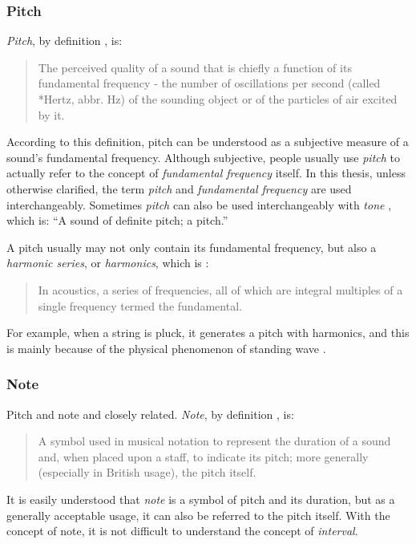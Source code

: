 \subsubsection{Pitch}
{\it Pitch}, by definition \cite{randel1999harvard}, is:
\begin{quote}
The perceived quality of a sound that is chiefly a function of its fundamental frequency - the number of oscillations per second (called *Hertz, abbr. Hz) of the sounding object or of the particles of air excited by it.
\end{quote}
According to this definition, pitch can be understood as a subjective measure of a sound's fundamental frequency. Although subjective, people usually use {\it pitch} to actually refer to the concept of {\it fundamental frequency} itself. In this thesis, unless otherwise clarified, the term {\it pitch} and {\it fundamental frequency} are used interchangeably. Sometimes {\it pitch} can also be used interchangeably with {\it tone} \cite{randel1999harvard}, which is: ``A sound of definite pitch; a pitch.''

A pitch usually may not only contain its fundamental frequency, but also a {\it harmonic series}, or {\it harmonics}, which is \cite{randel1999harvard}:
\begin{quote}
In acoustics, a series of frequencies, all of which are integral multiples of a single frequency termed the fundamental.
\end{quote}
For example, when a string is pluck, it generates a pitch with harmonics, and this is mainly because of the physical phenomenon of standing wave \cite{helmholtz2009sensations}.

\subsubsection{Note}
Pitch and note and closely related. {\it Note}, by definition \cite{randel1999harvard}, is:
\begin{quote}
A symbol used in musical notation to represent the duration of a sound and, when placed upon a staff, to indicate its pitch; more generally (especially in British usage), the pitch itself.
\end{quote}

It is easily understood that {\it note} is a symbol of pitch and its duration, but as a generally acceptable usage, it can also be referred to the pitch itself. With the concept of note, it is not difficult to understand the concept of {\it interval}.

